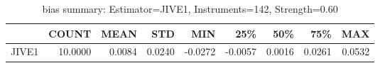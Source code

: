 \begin{table}[ht]
\centering
\caption{bias summary: Estimator=JIVE1, Instruments=142, Strength=0.60}
\begin{tabular}{lrrrrrrrr}
\toprule
 & COUNT & MEAN & STD & MIN & 25\% & 50\% & 75\% & MAX \\
\midrule
JIVE1 & 10.0000 & 0.0084 & 0.0240 & -0.0272 & -0.0057 & 0.0016 & 0.0261 & 0.0532 \\
\bottomrule
\end{tabular}
\end{table}
